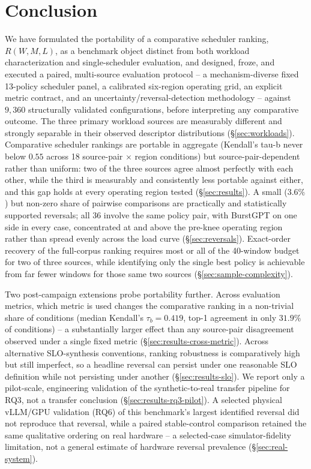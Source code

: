 \section{Conclusion}
\label{sec:conclusion}

We have formulated the portability of a comparative scheduler ranking,
$R(W, M, L)$, as a benchmark object distinct from both workload
characterization and single-scheduler evaluation, and designed, froze, and
executed a paired, multi-source evaluation protocol -- a mechanism-diverse
fixed 13-policy scheduler panel, a calibrated six-region operating grid, an
explicit metric contract, and an uncertainty/reversal-detection
methodology -- against $9{,}360$ structurally validated configurations, before
interpreting any comparative outcome. The three primary workload sources
are measurably different and strongly separable in their observed
descriptor distributions (\S\ref{sec:workloads}). Comparative scheduler
rankings are portable in aggregate (Kendall's tau-b never below $0.55$
across 18 source-pair $\times$ region conditions) but source-pair-dependent
rather than uniform: two of the three sources agree almost perfectly with
each other, while the third is measurably and consistently less portable
against either, and this gap holds at every operating region tested
(\S\ref{sec:results}). A small ($3.6\%$) but non-zero share of pairwise
comparisons are practically and statistically supported reversals; all
$36$ involve the same policy pair, with BurstGPT on one side in every
case, concentrated at and above the pre-knee operating region rather than
spread evenly across the load curve (\S\ref{sec:reversals}). Exact-order recovery
of the full-corpus ranking requires most or all of the 40-window budget
for two of three sources, while identifying only the single best policy is
achievable from far fewer windows for those same two sources
(\S\ref{sec:sample-complexity}).

Two post-campaign extensions probe portability further. Across
evaluation metrics, which metric is used changes the comparative ranking
in a non-trivial share of conditions (median Kendall's $\tau_b = 0.419$,
top-1 agreement in only $31.9\%$ of conditions) -- a substantially larger
effect than any source-pair disagreement observed under a single fixed
metric (\S\ref{sec:results-cross-metric}). Across alternative
SLO-synthesis conventions, ranking robustness is comparatively high but
still imperfect, so a headline reversal can persist under one reasonable
SLO definition while not persisting under another
(\S\ref{sec:results-slo}). We report only a pilot-scale, engineering
validation of the synthetic-to-real transfer pipeline for RQ3, not a
transfer conclusion (\S\ref{sec:results-rq3-pilot}). A selected physical
vLLM/GPU validation (RQ6) of this benchmark's largest identified reversal
did not reproduce that reversal, while a paired stable-control comparison
retained the same qualitative ordering on real hardware -- a selected-case
simulator-fidelity limitation, not a general estimate of hardware
reversal prevalence (\S\ref{sec:real-system}).

